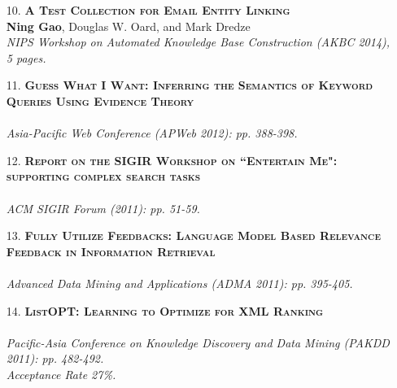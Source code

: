\documentclass[a4paper, 11pt]{article}
\begin{document}
\begin{itemize}
\item[\color{bl3} 10.]{\scshape\color{bl3}\bf A Test Collection for Email Entity Linking}\\
{\color{black} \textbf{Ning Gao}, Douglas W. Oard, and Mark Dredze \\
\emph{NIPS Workshop on Automated Knowledge Base Construction (AKBC 2014), 5 pages.}}
\vspace{2mm}

        
\item[\color{bl3} 11.]{\scshape\color{bl3}\bf Guess What I Want: Inferring the Semantics of Keyword Queries Using Evidence Theory}\\
\\
\emph{ Asia-Pacific Web Conference (APWeb 2012): pp. 388-398.}
\vspace{2mm}



\item[\color{bl3} 12.]{\scshape\color{bl3}\bf Report on the SIGIR Workshop on ``Entertain Me": supporting complex search tasks}\\
\\
\emph{ ACM SIGIR Forum (2011): pp. 51-59.}
\vspace{2mm}

\item[\color{bl3} 13.]{\scshape\color{bl3}\bf Fully Utilize Feedbacks: Language Model Based Relevance Feedback in Information Retrieval}\\
\\
\emph{ Advanced Data Mining and Applications (ADMA 2011): pp. 395-405.}
\vspace{2mm}

\item[\color{bl3} 14.]{\scshape\color{bl3}\bf ListOPT: Learning to Optimize for XML Ranking}\\
\\
\emph{ Pacific-Asia Conference on Knowledge Discovery and Data Mining (PAKDD 2011): pp. 482-492.\\Acceptance Rate 27\%.}

\vspace{2mm}


\end{itemize}
\end{document}
